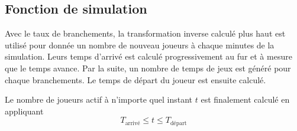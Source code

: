 \documentclass[11pt]{article}
\begin{document}
    \subsection{Fonction de simulation}\label{fonction-de-simulation}

Avec le taux de branchements, la transformation inverse calculé plus
haut est utilisé pour donnée un nombre de nouveau joueurs à chaque
minutes de la simulation. Leurs temps d'arrivé est calculé
progressivement au fur et à mesure que le temps avance. Par la suite, un
nombre de temps de jeux est généré pour chaque branchements. Le temps de
départ du joueur est ensuite calculé.

Le nombre de joueurs actif à n'importe quel instant \(t\) est finalement
calculé en appliquant \[
    T_{\text{arrivé}} \le t \le T_{\text{départ}}
\]
\end{document}
